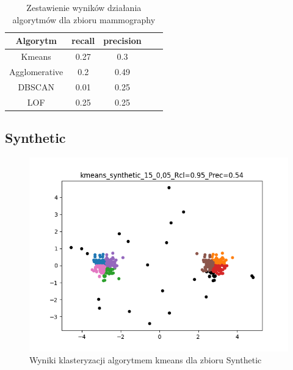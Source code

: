 \documentclass{classrep}
\begin{document}
{{            \begin{table}[!htbp]
                \centering
                \begin{tabular}{|c|c|c|c|c|}
                    \hline
                    Algorytm & recall & precision \\ \hline
                    Kmeans & 0.27 & 0.3  \\ \hline
                    Agglomerative & 0.2 & 0.49  \\ \hline
                    DBSCAN & 0.01 & 0.25  \\ \hline
                    LOF & 0.25 & 0.25  \\ \hline
                \end{tabular}
                \caption
                {Zestawienie wyników działania algorytmów dla zbioru mammography}
                \label{tab:mammo}
            \end{table}
            \FloatBarrier
        }

        \subsection{Synthetic} {

            \begin{figure}[!htbp]
                \centering
                \includegraphics[width=\textwidth]{img/kmeans_synthetic_15_0,05_-115716.png}
                \caption
                {Wyniki klasteryzacji algorytmem kmeans dla zbioru Synthetic}
                \label{fig:synth_kmeans}
            \end{figure}

}}
\end{document}
